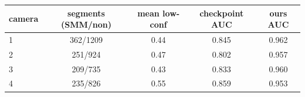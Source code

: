 \begin{tabular}{lcccc}
\toprule
camera & segments (SMM/non) & mean low-conf & checkpoint AUC & ours AUC \\
\midrule
1 & 362/1209 & 0.44 & 0.845 & 0.962 \\
2 & 251/924 & 0.47 & 0.802 & 0.957 \\
3 & 209/735 & 0.43 & 0.833 & 0.960 \\
4 & 235/826 & 0.55 & 0.859 & 0.953 \\
\bottomrule
\end{tabular}
